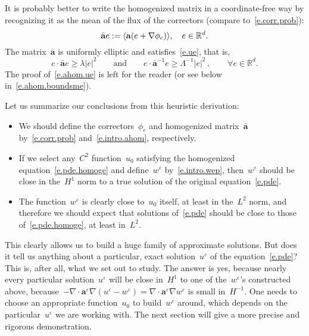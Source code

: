 \documentclass[11pt,twoside]{article} %
\numberwithin{equation}{section}
\theoremstyle{definition}
\let\originalleft\left
\let\originalright\right
\renewcommand{\left}{\mathopen{}\mathclose\bgroup\originalleft}
\renewcommand{\right}{\aftergroup\egroup\originalright}
\newcommand*{\R}{\ensuremath{\mathbb{R}}}
\newcommand{\eps}{\varepsilon}
\newcommand{\ep}{\eps}
\renewcommand{\a}{\mathbf{a}}
\newcommand{\ahom}{\bar{\a}}
\begin{document}
\smallskip

It is probably better to write the homogenized matrix in a coordinate-free way by recognizing it as the mean of the flux of the correctors (compare to~\eqref{e.corr.prob}): 
\begin{equation}
\label{e.intro.ahom}
\ahom e
:=
\left\langle \a \left( e+ \nabla \phi_e    \right) \right\rangle, \quad e\in\R^d. 
\end{equation}
The matrix~$\ahom$ is uniformly elliptic and satisfies~\eqref{e.ue}, that is, 
\begin{equation}
\label{e.ahom.ue}
e\cdot \ahom e\geq \lambda |e|^2 
\qquad \mbox{and} \qquad 
e\cdot \ahom^{-1} e\geq \Lambda^{-1} |e|^2 \,,
\qquad 
\forall e\in\R^d. 
\end{equation}
The proof of~\eqref{e.ahom.ue} is left for the reader (or see below in~\eqref{e.ahom.boundsme}).

\smallskip

Let us summarize our conclusions from this heuristic derivation:
\begin{itemize}
\item We should  define the correctors~$\phi_e$ and homogenized matrix~$\ahom$ by~\eqref{e.corr.prob} and~\eqref{e.intro.ahom}, respectively.

\item If we select any~$C^2$ function~$u_0$ satisfying the homogenized equation~\eqref{e.pde.homoge} and define~$w^\ep$ by~\eqref{e.intro.wep}, then~$w^\ep$ should be close in the~$H^1$ norm to a true solution of the original equation~\eqref{e.pde}.

\item The function~$w^\ep$ is clearly close to~$u_0$ itself, at least in the~$L^2$ norm, and therefore we should expect that solutions of~\eqref{e.pde} should be close to those of~\eqref{e.pde.homoge}, at least in~$L^2$. 

\end{itemize}

This clearly allows us to build a huge family of approximate solutions. But does it tell us anything about a particular, exact solution~$u^\ep$ of the equation~\eqref{e.pde}? This is, after all, what we set out to study. 
The answer is yes, because nearly every particular solution~$u^\ep$ will be close in~$H^1$ to one of the~$w^\ep$'s constructed above, because~$-\nabla\cdot \a^\ep\nabla (u^\ep - w^\ep) = \nabla\cdot \a^\ep\nabla w^\ep$ is small in~$H^{-1}$. One needs to choose an appropriate function~$u_0$ to build~$w^\ep$ around, which depends on the particular~$u^\ep$ we are working with. The next section will give a more precise and rigorous demonstration. 
\end{document}
